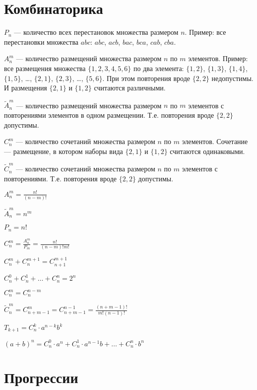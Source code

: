 \section{Комбинаторика}

$ P_n $ --- количество всех перестановок множества размером $ n $. Пример: все перестановки множества $abc$: $abc$, $acb$, $bac$, $bca$, $cab$, $cba$.

$ A^m_n $ --- количество размещений множества размером $ n $ по $ m $ элементов. Пример: все размещения множества $ \{1, 2, 3, 4, 5, 6 \} $ по два элемента: $ \{1, 2\} $, $ \{1, 3\} $, $ \{1, 4\} $, $ \{1, 5\} $, \dots, $ \{2, 1\} $, $ \{2, 3\} $,  \dots, $ \{5, 6\} $. При этом повторения вроде $ \{2, 2\} $ недопустимы. И размещения $ \{2, 1 \} $ и $ \{ 1, 2 \} $ считаются различными.

$ \widetilde{A}^m_n $ --- количество размещений множества размером $ n $ по $ m $ элементов с повторениями элементов в одном размещении. Т.е. повторения вроде $ \{2, 2\} $ допустимы.

$ C^m_n $ --- количество сочетаний множества размером $n$ по $m$ элементов. Сочетание --- размещение, в котором наборы вида $ \{2, 1 \} $ и $ \{ 1, 2 \} $ считаются одинаковыми.

$ \widetilde{C}^m_n $ --- количество сочетаний множества размером $n$ по $m$ элементов с повторениями. Т.е. повторения вроде $ \{2, 2\} $ допустимы.

$ A^m_n = \frac{n!}{(n-m)!} $

$ \widetilde{A}^m_n = n^m $

$ P_n = n! $

$ C^m_n = \frac{A^m_n}{P_m} = \frac{n!}{(n-m)!m!} $

$ C^m_n + C^{m+1}_n = C^{m+1}_{n+1} $

$ C^0_n + C^1_n + \dots + C^n_n = 2^n $

$ C^m_n = C^{n-m}_n $

$ \widetilde{C}^m_n = C^m_{n+m-1} = C^{n-1}_{n+m-1} = \frac{(n+m-1)!}{m!(n-1)!} $

$ T_{k+1} = C^k_n\cdot a^{n-k}b^k $

$ (a+b)^n = C^0_n\cdot a^n + C^1_n\cdot a^{n-1}b + \dots + C^n_n\cdot b^n $

	
\section{Прогрессии}

